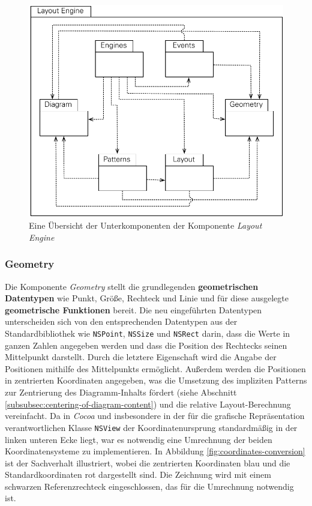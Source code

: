 \begin{figure}[hbt]
    \centering
    \includegraphics[scale=0.85]{assets/layout-engine-subcomponents}
    \caption{Eine Übersicht der Unterkomponenten der Komponente \textit{Layout Engine}}
    \label{fig:layout-engine-subcomponents}
\end{figure}

\subsubsection{Geometry}
\label{subsubsec:geometry}

Die Komponente \textit{Geometry} stellt die grundlegenden \textbf{geometrischen Datentypen} wie Punkt, Größe, Rechteck und Linie und für diese ausgelegte \textbf{geometrische Funktionen} bereit. Die neu eingeführten Datentypen unterscheiden sich von den entsprechenden Datentypen aus der Standardbibliothek wie \texttt{NSPoint}, \texttt{NSSize} und \texttt{NSRect} darin, dass die Werte in ganzen Zahlen angegeben werden und dass die Position des Rechtecks seinen Mittelpunkt darstellt. Durch die letztere Eigenschaft wird die Angabe der Positionen mithilfe des Mittelpunkts ermöglicht. Außerdem werden die Positionen in zentrierten Koordinaten angegeben, was die Umsetzung des impliziten Patterns zur Zentrierung des Diagramm-Inhalts fördert (siehe Abschnitt \ref{subsubsec:centering-of-diagram-content}) und die relative Layout-Berechnung vereinfacht. Da in \textit{Cocoa} und insbesondere in der für die grafische Repräsentation verantwortlichen Klasse \texttt{NSView} der Koordinatenursprung standardmäßig in der linken unteren Ecke liegt, war es notwendig eine Umrechnung der beiden Koordinatensysteme zu implementieren. In Abbildung \ref{fig:coordinates-conversion} ist der Sachverhalt illustriert, wobei die zentrierten Koordinaten blau und die Standardkoordinaten rot dargestellt sind. Die Zeichnung wird mit einem schwarzen Referenzrechteck eingeschlossen, das für die Umrechnung notwendig ist.

